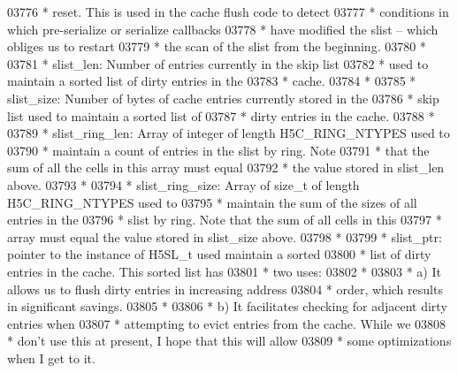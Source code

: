 \begin{DoxyCode}
03776 \textcolor{comment}{ *      reset.  This is used in the cache flush code to detect }
03777 \textcolor{comment}{ *      conditions in which pre-serialize or serialize callbacks}
03778 \textcolor{comment}{ *      have modified the slist -- which obliges us to restart }
03779 \textcolor{comment}{ *      the scan of the slist from the beginning.}
03780 \textcolor{comment}{ *}
03781 \textcolor{comment}{ * slist\_len:   Number of entries currently in the skip list}
03782 \textcolor{comment}{ *              used to maintain a sorted list of dirty entries in the}
03783 \textcolor{comment}{ *              cache.}
03784 \textcolor{comment}{ *}
03785 \textcolor{comment}{ * slist\_size:  Number of bytes of cache entries currently stored in the}
03786 \textcolor{comment}{ *              skip list used to maintain a sorted list of}
03787 \textcolor{comment}{ *              dirty entries in the cache.}
03788 \textcolor{comment}{ *}
03789 \textcolor{comment}{ * slist\_ring\_len: Array of integer of length H5C\_RING\_NTYPES used to }
03790 \textcolor{comment}{ *      maintain a count of entries in the slist by ring.  Note }
03791 \textcolor{comment}{ *      that the sum of all the cells in this array must equal }
03792 \textcolor{comment}{ *      the value stored in slist\_len above.}
03793 \textcolor{comment}{ *}
03794 \textcolor{comment}{ * slist\_ring\_size: Array of size\_t of length H5C\_RING\_NTYPES used to}
03795 \textcolor{comment}{ *              maintain the sum of the sizes of all entries in the }
03796 \textcolor{comment}{ *      slist by ring.  Note that the sum of all cells in this }
03797 \textcolor{comment}{ *      array must equal the value stored in slist\_size above.}
03798 \textcolor{comment}{ *}
03799 \textcolor{comment}{ * slist\_ptr:   pointer to the instance of H5SL\_t used maintain a sorted}
03800 \textcolor{comment}{ *              list of dirty entries in the cache.  This sorted list has}
03801 \textcolor{comment}{ *              two uses:}
03802 \textcolor{comment}{ *}
03803 \textcolor{comment}{ *              a) It allows us to flush dirty entries in increasing address}
03804 \textcolor{comment}{ *                 order, which results in significant savings.}
03805 \textcolor{comment}{ *}
03806 \textcolor{comment}{ *              b) It facilitates checking for adjacent dirty entries when}
03807 \textcolor{comment}{ *                 attempting to evict entries from the cache.  While we}
03808 \textcolor{comment}{ *                 don't use this at present, I hope that this will allow}
03809 \textcolor{comment}{ *                 some optimizations when I get to it.}

\end{DoxyCode}
